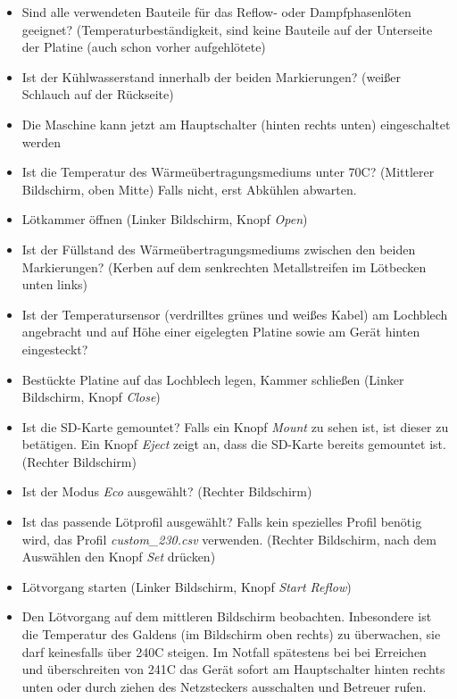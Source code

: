 \documentclass{\basedir/fablab-document}
\begin{document}
	\begin{itemize}

	\item Sind alle verwendeten Bauteile f{\"u}r das Reflow- oder Dampfphasenl{\"o}ten geeignet? (Temperaturbest{\"a}ndigkeit, sind keine Bauteile auf der Unterseite der Platine (auch schon vorher aufgehl{\"o}tete)
	\item Ist der K{\"u}hlwasserstand innerhalb der beiden Markierungen? (wei{\ss}er Schlauch auf der R{\"u}ckseite) 
	\item Die Maschine kann jetzt am Hauptschalter (hinten rechts unten) eingeschaltet werden
	\item Ist die Temperatur des W{\"a}rme{\"u}bertragungsmediums unter 70\textdegree C? (Mittlerer Bildschirm, oben Mitte) Falls nicht, erst Abk{\"u}hlen abwarten.
	\item L{\"o}tkammer {\"o}ffnen (Linker Bildschirm, Knopf \textit{Open})
	\item Ist der F{\"u}llstand des W{\"a}rme{\"u}bertragungsmediums zwischen den beiden Markierungen? (Kerben auf dem senkrechten Metallstreifen im L{\"o}tbecken unten links)
	\item Ist der Temperatursensor (verdrilltes gr{\"u}nes und wei{\ss}es Kabel) am Lochblech angebracht und auf H{\"o}he einer eigelegten Platine sowie am Ger{\"a}t hinten eingesteckt?
	\item Best{\"u}ckte Platine auf das Lochblech legen, Kammer schlie{\ss}en (Linker Bildschirm, Knopf \textit{Close})
	\item Ist die SD-Karte gemountet? Falls ein Knopf \textit{Mount} zu sehen ist, ist dieser zu bet{\"a}tigen. Ein Knopf \textit{Eject} zeigt an, dass die SD-Karte bereits gemountet ist. (Rechter Bildschirm)
	\item Ist der Modus \textit{Eco} ausgew{\"a}hlt? (Rechter Bildschirm)
	\item Ist das passende L{\"o}tprofil ausgew{\"a}hlt? Falls kein spezielles Profil ben{\"o}tig wird, das Profil \textit{custom\_230.csv} verwenden. (Rechter Bildschirm, nach dem Ausw{\"a}hlen den Knopf \textit{Set} dr{\"u}cken)
	\item L{\"o}tvorgang starten (Linker Bildschirm, Knopf \textit{Start Reflow})
	\item Den L{\"o}tvorgang auf dem mittleren Bildschirm beobachten. Inbesondere ist die Temperatur des Galdens (im Bildschirm oben rechts) zu {\"u}berwachen, sie darf keinesfalls {\"u}ber 240\textdegree C steigen. Im Notfall sp{\"a}testens bei bei Erreichen und {\"u}berschreiten von 241\textdegree C das Ger{\"a}t sofort am Hauptschalter hinten rechts unten oder durch ziehen des Netzsteckers ausschalten und Betreuer rufen. 

\end{itemize}
\end{document}
